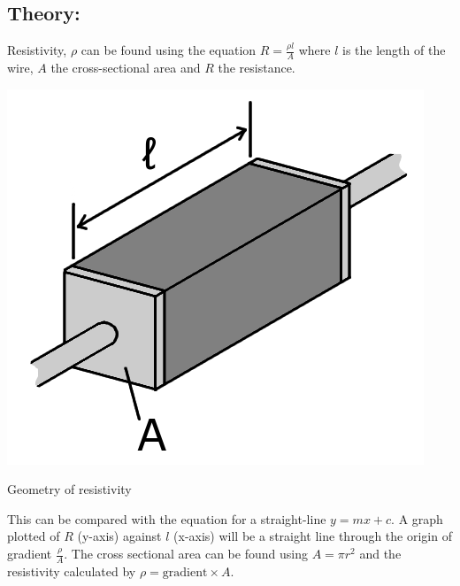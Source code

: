 \documentclass{tufte-handout}
\begin{document}
\subsection{Theory:}  Resistivity, $\rho$ can be found using the equation $R=\frac{\rho l}{A}$ where $l$ is the length of the wire, $A$ the cross-sectional area and $R$ the resistance.\begin{marginfigure}
\includegraphics[]{resistivity.png}
\caption{Geometry of resistivity}
\end{marginfigure} This can be compared with the equation for a straight-line $ y = mx +c$. A graph plotted of $R$ (y-axis) against $l$ (x-axis) will be a straight line through the origin of gradient $\frac{\rho}{A}$. The cross sectional area can be found using $A=\pi r^{2}$ and the resistivity calculated by $ \rho = \text{gradient} \times A$.  
\end{document}
